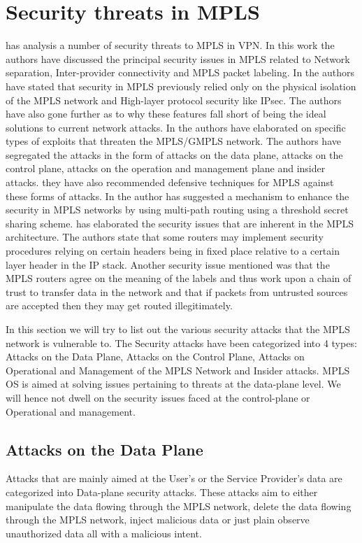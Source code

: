\section{Security threats in MPLS}
\cite{grayson2009analysis} has analysis a number of security threats to MPLS in VPN. In this work the authors have discussed the principal security issues in MPLS related to Network separation, Inter-provider connectivity and MPLS packet labeling. In \cite{mpls-os-internet-draft} the authors have stated that security in MPLS previously relied only on the physical isolation of the MPLS network and High-layer protocol security like IPsec. The authors have also gone further as to why these features fall short of being the ideal solutions to current network attacks. In \cite{rfc5920} the authors have elaborated on specific types of exploits that threaten the MPLS/GMPLS network. The authors have segregated the attacks in the form of attacks on the data plane, attacks on the control plane, attacks on the operation and management plane and insider attacks. they have also recommended defensive techniques for MPLS against these forms of attacks. In \cite{alouneh2009novel} the author has suggested a mechanism to enhance the security in MPLS networks by using multi-path routing using a threshold secret sharing scheme. \cite{rfc3032} has elaborated the security issues that are inherent in the MPLS architecture. The authors state that some routers may implement security procedures relying on certain headers being in fixed place relative to a certain layer header in the IP stack. Another security issue mentioned was that the MPLS routers agree on the meaning of the labels and thus work upon a chain of trust to transfer data in the network and that if packets from untrusted sources are accepted then they may get routed illegitimately.
 
In this section we will try to list out the various security attacks that the MPLS network is vulnerable to. The Security attacks have been categorized into 4 types: Attacks on the Data Plane, Attacks on the Control Plane, Attacks on Operational and Management of the MPLS Network and Insider attacks. MPLS OS is aimed at solving issues pertaining to threats at the data-plane level. We will hence not dwell on the security issues faced at the control-plane or Operational and management.
    
\subsection{Attacks on the Data Plane}
Attacks that are mainly aimed at the User's or the Service Provider's data are categorized into Data-plane security attacks. These attacks aim to either manipulate the data flowing through the MPLS network, delete the data flowing through the MPLS network, inject malicious data or just plain observe unauthorized data all with a malicious intent.

